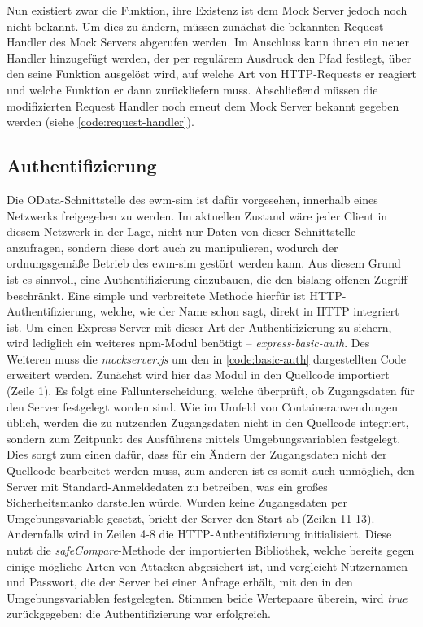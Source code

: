 

Nun existiert zwar die Funktion, ihre Existenz ist dem Mock Server jedoch noch nicht bekannt.
Um dies zu ändern, müssen zunächst die bekannten Request Handler des Mock Servers abgerufen werden.
Im Anschluss kann ihnen ein neuer Handler hinzugefügt werden, der per regulärem Ausdruck den Pfad festlegt, über den seine Funktion ausgelöst wird, auf welche Art von \ac{HTTP}-Requests er reagiert und welche Funktion er dann zurückliefern muss.
Abschließend müssen die modifizierten Request Handler noch erneut dem Mock Server bekannt gegeben werden (siehe \autoref{code:request-handler}).




\subsection{Authentifizierung}
Die \ac{OData}-Schnittstelle des \ac{ewm-sim} ist dafür vorgesehen, innerhalb eines Netzwerks freigegeben zu werden.
Im aktuellen Zustand wäre jeder Client in diesem Netzwerk in der Lage, nicht nur Daten von dieser Schnittstelle anzufragen, sondern diese dort auch zu manipulieren, wodurch der ordnungsgemäße Betrieb des \ac{ewm-sim} gestört werden kann.
Aus diesem Grund ist es sinnvoll, eine Authentifizierung einzubauen, die den bislang offenen Zugriff beschränkt.
Eine simple und verbreitete Methode hierfür ist \ac{HTTP}-Authentifizierung, welche, wie der Name schon sagt, direkt in \ac{HTTP} integriert ist.
Um einen Express-Server mit dieser Art der Authentifizierung zu sichern, wird lediglich ein weiteres \ac{npm}-Modul benötigt -- \emph{express-basic-auth}.
Des Weiteren muss die \emph{mockserver.js} um den in \autoref{code:basic-auth} dargestellten Code erweitert werden.
Zunächst wird hier das Modul in den Quellcode importiert (Zeile 1).
Es folgt eine Fallunterscheidung, welche überprüft, ob Zugangsdaten für den Server festgelegt worden sind.
Wie im Umfeld von Containeranwendungen üblich, werden die zu nutzenden Zugangsdaten nicht in den Quellcode integriert, sondern zum Zeitpunkt des Ausführens mittels Umgebungsvariablen festgelegt.
Dies sorgt zum einen dafür, dass für ein Ändern der Zugangsdaten nicht der Quellcode bearbeitet werden muss, zum anderen ist es somit auch unmöglich, den Server mit Standard-Anmeldedaten zu betreiben, was ein großes Sicherheitsmanko darstellen würde.
Wurden keine Zugangsdaten per Umgebungsvariable gesetzt, bricht der Server den Start ab (Zeilen 11-13).
Andernfalls wird in Zeilen 4-8 die \ac{HTTP}-Authentifizierung initialisiert.
Diese nutzt die \emph{safeCompare}-Methode der importierten Bibliothek, welche bereits gegen einige mögliche Arten von Attacken abgesichert ist, und vergleicht Nutzernamen und Passwort, die der Server bei einer Anfrage erhält, mit den in den Umgebungsvariablen festgelegten.
Stimmen beide Wertepaare überein, wird \emph{true} zurückgegeben; die Authentifizierung war erfolgreich.

